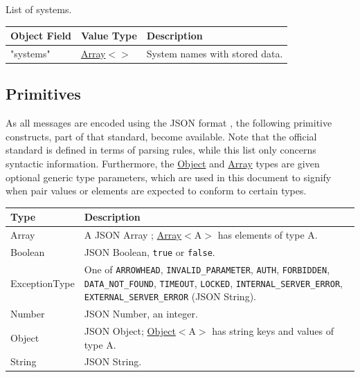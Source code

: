 \documentclass[a4paper]{arrowhead}
\newcommand{\pdef}[1]{{\textcolor{ArrowheadGrey}{#1 \label{sec:model:primitives:#1} \label{sec:model:primitives:#1s}}}}
\newcommand{\pref}[1]{{\textcolor{ArrowheadGrey}{\hyperref[sec:model:primitives:#1]{#1}}}}
\begin{document}
List of systems.


\noindent\begin{tabularx}{\textwidth}{| >{\raggedright\arraybackslash}p{3.9cm} | >{\raggedright\arraybackslash\small}p{5.3cm} | X |} \hline
\rowcolor{gray!33} Object Field & Value Type & Description \\ \hline
"systems" & \pref{Array}$<$\allowbreak{}\pref{String}$>$ & System names with stored data. \\ \hline
\end{tabularx}



\subsection{Primitives}
\label{sec:model:primitives}

As all messages are encoded using the JSON format \cite{rfc8259}, the following primitive constructs, part of that standard, become available.
Note that the official standard is defined in terms of parsing rules, while this list only concerns syntactic information.
Furthermore, the \pref{Object} and \pref{Array} types are given optional generic type parameters, which are used in this document to signify when pair values or elements are expected to conform to certain types.

\noindent\begin{tabularx}{\textwidth}{| p{4.6cm} | X |} \hline
\rowcolor{gray!33} Type & Description \\ \hline
\pdef{Array} & A JSON Array \cite{rfc8259}; \pref{Array}$<$A$>$ has elements of type A. \\ \hline
\pdef{Boolean} & JSON Boolean, \texttt{true} or \texttt{false}. \\ \hline
\pdef{ExceptionType} & One of \texttt{ARROWHEAD}, \texttt{INVALID\_\allowbreak{}PARAMETER}, \texttt{AUTH}, \texttt{FORBIDDEN}, \texttt{DATA\_\allowbreak{}NOT\_\allowbreak{}FOUND}, \texttt{TIMEOUT}, \texttt{LOCKED}, \texttt{INTERNAL\_\allowbreak{}SERVER\_\allowbreak{}ERROR}, \texttt{EXTERNAL\_\allowbreak{}SERVER\_\allowbreak{}ERROR} (JSON String). \\ \hline
\pdef{Number} & JSON Number, an integer. \\ \hline
\pdef{Object} & JSON Object; \pref{Object}$<$A$>$ has string keys and values of type A. \\ \hline
\pdef{String} & JSON String. \\ \hline
\end{tabularx}
\end{document}
